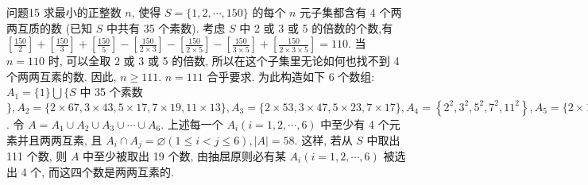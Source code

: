 问题15 求最小的正整数 $n$, 使得 $S=\{1,2, \cdots, 150\}$ 的每个 $n$ 元子集都含有 4 个两两互质的数 (已知 $S$ 中共有 35 个素数).
考虑 $S$ 中 2 或 3 或 5 的倍数的个数,有 $\left[\frac{150}{2}\right]+\left[\frac{150}{3}\right]+\left[\frac{150}{5}\right]- \left[\frac{150}{2 \times 3}\right]-\left[\frac{150}{2 \times 5}\right]-\left[\frac{150}{3 \times 5}\right]+\left[\frac{150}{2 \times 3 \times 5}\right]=110$. 当 $n=110$ 时, 可以全取 2 或 3 或 5 的倍数, 所以在这个子集里无论如何也找不到 4 个两两互素的数.
因此, $n \geqslant 111$.
$n=111$ 合乎要求.
为此构造如下 6 个数组: $A_1=\{1\} \bigcup\{S$ 中 35 个素数 $\}, A_2=\{2 \times 67,3 \times 43,5 \times 17,7 \times 19,11 \times 13\}, A_3=\{2 \times 53,3 \times 47,5 \times 23,7 \times 17\}, A_4=\left\{2^2, 3^2, 5^2, 7^2, 11^2\right\}, A_5= \{2 \times 19,3^3, 5 \times 13,7 \times 11\}, A_6=\left\{2^3, 3 \times 23,5 \times 11,7 \times 13\right\}$. 令 $A=A_1 \cup A_2 \cup A_3 \cup \cdots \cup A_6$. 上述每一个 $A_i(i=1,2, \cdots, 6)$ 中至少有 4 个元素并且两两互素, 且 $A_i \cap A_j=\varnothing(1 \leqslant i<j \leqslant 6),|A|=58$. 这样, 若从 $S$ 中取出 111 个数, 则 $A$ 中至少被取出 19 个数, 由抽屈原则必有某 $A_i(i=1,2, \cdots, 6)$ 被选出 4 个, 而这四个数是两两互素的.



